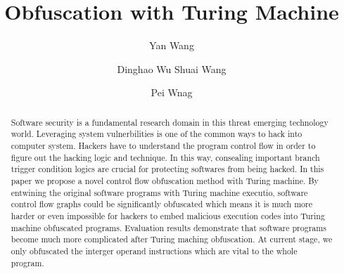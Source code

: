 \documentclass[lnicst]{svmultln}
\begin{document}
%
\mainmatter              %
%
\title{Obfuscation with Turing Machine}
%
%
\author{Yan Wang \and Dinghao Wu
Shuai Wang \and Pei Wnag}
%
%
%
\institute{Pennsylvania State University, State College,PA 16801, USA,\\
\email{ybw5084@ist.psu.edu},\\ WWW home page:
\texttt{http://users/\homedir iekeland/web/welcome.html}
}
\maketitle              

\begin{abstract}        %
Software security is a fundamental research domain in this threat emerging technology world. Leveraging system vulnerbilities is one of the common ways to hack into 
computer system. Hackers have to understand the program control flow in order to figure out the hacking logic and technique. In this way, consealing important branch trigger condition logics are crucial for protecting softwares from being hacked. In this paper we propose a novel control flow obfuscation method with Turing machine. By entwining the original software programs with Turing machine executio, software control flow graphs could be significantly obfuscated which means it is much more harder or even impossible for hackers to embed malicious execution codes into Turing machine obfuscated programs. Evaluation results demonstrate that software programs become much more complicated after Turing maching obfuscation. At current stage, we only obfuscated the interger operand instructions which are vital to the whole program.
\end{abstract}
%
\end{document}
